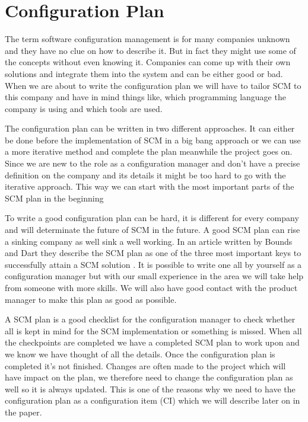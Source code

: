 \documentclass[a4paper,10pt]{article}
\begin{document}
\section{Configuration Plan}


The term software configuration management is for many companies unknown and they have no clue on how to describe it.
But in fact they might use some of the concepts without even knowing it.
Companies can come up with their own solutions and integrate them into the system and can be either good or bad.
When we are about to write the configuration plan we will have to tailor SCM to this company and have in mind things like, which programming language the company is using and which tools are used.

The configuration plan can be written in two different approaches. \cite{SCMPLAN} It can either be done before the implementation of SCM in a big bang approach or we can use a more iterative method and complete the plan meanwhile the project goes on.
Since we are new to the role as a configuration manager and don’t have a precise definition on the company and its details it might be too hard to go with the iterative approach.
This way we can start with the most important parts of the SCM plan in the beginning

To write a good configuration plan can be hard, it is different for every company and will determinate the future of SCM in the future.
A good SCM plan can rise a sinking company as well sink a well working.
In an article written by Bounds and Dart they describe the SCM plan as one of the three most important keys to successfully attain a SCM solution \cite{BoundsDart}.
It is possible to write one all by yourself as a configuration manager but with our small experience in the area we will take help from someone with more skills.
We will also have good contact with the product manager to make this plan as good as possible.

A SCM plan is a good checklist for the configuration manager to check whether all is kept in mind for the SCM implementation or something is missed. When all the checkpoints are completed we have a completed SCM plan to work upon and we know we have thought of all the details. Once the configuration plan is completed it’s not finished. Changes are often made to the project which will have impact on the plan, we therefore need to change the configuration plan as well so it is always updated. This is one of the reasons why we need to have the configuration plan as a configuration item (CI) which we will describe later on in the paper.
\end{document}
